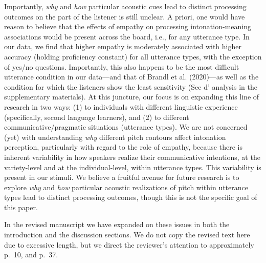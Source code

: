 \documentclass[]{article}
\newcommand{\TaskEstimationBox}[2]{%
\ifoptiondraft{\parbox{1.0\linewidth}{\hfill \hfill {\colorbox{#2}{\color{White} \textbf{#1}}}}}%
{}%
}
\def\Done {\TaskEstimationBox{Done}{Blue}}
\def\Easy {\TaskEstimationBox{Feasible}{ForestGreen}}
\begin{document}
Importantly, \emph{why} and \emph{how} particular acoustic cues lead to distinct processing outcomes on the part of the listener is still unclear.
A priori, one would have reason to believe that the effects of empathy on processing intonation-meaning associations would be present across the board, i.e., for any utterance type.
In our data, we find that higher empathy is moderately associated with higher accuracy (holding proficiency constant) for all utterance types, with the exception of yes/no questions.
Importantly, this also happens to be the most difficult utterance condition in our data---and that of Brandl et al. (2020)---as well as the condition for which the listeners show the least sensitivity (See d' analysis in the supplementary materials).
At this juncture, our focus is on expanding this line of research in two ways: (1) to individuals with different linguistic experience (specifically, second language learners), and (2) to different communicative/pragmatic situations (utterance types).
We are not concerned (yet) with understanding \emph{why} different pitch contours affect intonation perception, particularly with regard to the role of empathy, because there is inherent variability in how speakers realize their communicative intentions, at the variety-level and at the individual-level, within utterance types.
This variability is present in our stimuli.
We believe a fruitful avenue for future research is to explore \emph{why} and \emph{how} particular acoustic realizations of pitch within utterance types lead to distinct processing outcomes, though this is not the specific goal of this paper.

In the revised manuscript we have expanded on these issues in both the introduction and the discussion sections.
We do not copy the revised text here due to excessive length, but we direct the reviewer's attention to approximately p.~10, and p.~37.

\Done
\Easy

\end{document}
